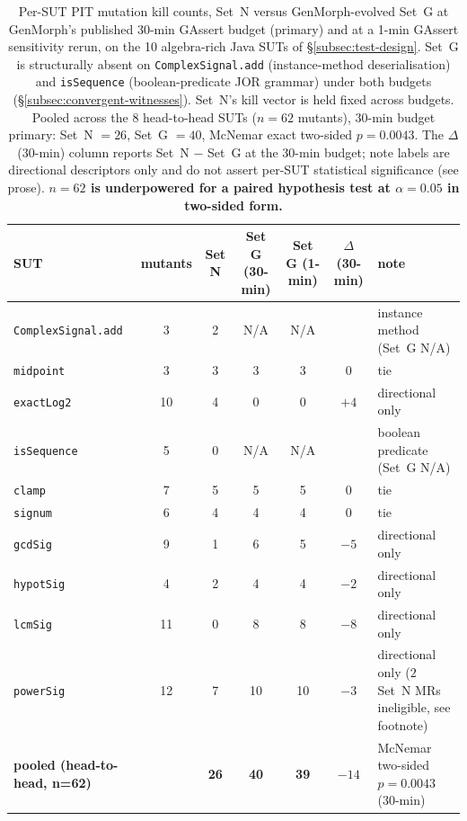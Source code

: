 \documentclass[acmsmall, screen]{acmart}
\begin{document}
\begin{table}[h]
\centering
\caption{Per-SUT PIT mutation kill counts, Set~N versus
GenMorph-evolved Set~G at GenMorph's published 30-min GAssert budget
(primary) and at a 1-min GAssert sensitivity rerun, on the 10
algebra-rich Java SUTs of \S\ref{subsec:test-design}. Set~G is
structurally absent on \texttt{ComplexSignal.add} (instance-method
deserialisation) and \texttt{isSequence} (boolean-predicate JOR
grammar) under both budgets (\S\ref{subsec:convergent-witnesses}).
Set~N's kill vector is held fixed across budgets. Pooled across the
8 head-to-head SUTs ($n = 62$ mutants), 30-min budget primary: Set~N
$= 26$, Set~G $= 40$, McNemar exact two-sided $p = 0.0043$. The
$\Delta$ (30-min) column reports Set~N $-$ Set~G at the 30-min budget;
note labels are directional descriptors only and do not assert
per-SUT statistical significance (see prose). \textbf{$n = 62$ is
underpowered for a paired hypothesis test at $\alpha = 0.05$ in
two-sided form.}}
\label{tab:algebra-rich-pooled}
\small
\begin{tabular}{lcccccl}
\toprule
SUT & mutants & Set N & Set G (30-min) & Set G (1-min) & $\Delta$ (30-min) & note \\
\midrule
\texttt{ComplexSignal.add} &  3 & 2 & N/A & N/A &      & instance method (Set~G N/A) \\
\texttt{midpoint}          &  3 & 3 & 3   & 3   & $0$  & tie \\
\texttt{exactLog2}         & 10 & 4 & 0   & 0   & $+4$ & directional only \\
\texttt{isSequence}        &  5 & 0 & N/A & N/A &      & boolean predicate (Set~G N/A) \\
\texttt{clamp}             &  7 & 5 & 5   & 5   & $0$  & tie \\
\texttt{signum}            &  6 & 4 & 4   & 4   & $0$  & tie \\
\texttt{gcdSig}            &  9 & 1 & 6   & 5   & $-5$ & directional only \\
\texttt{hypotSig}          &  4 & 2 & 4   & 4   & $-2$ & directional only \\
\texttt{lcmSig}            & 11 & 0 & 8   & 8   & $-8$ & directional only \\
\texttt{powerSig}          & 12 & 7 & 10  & 10  & $-3$ & directional only ($2$ Set~N MRs ineligible, see footnote) \\
\midrule
\textbf{pooled (head-to-head, n=62)}     &    & \textbf{26} & \textbf{40} & \textbf{39} & $-14$ & McNemar two-sided $p = 0.0043$ (30-min) \\
\bottomrule
\end{tabular}
\end{table}
\end{document}
